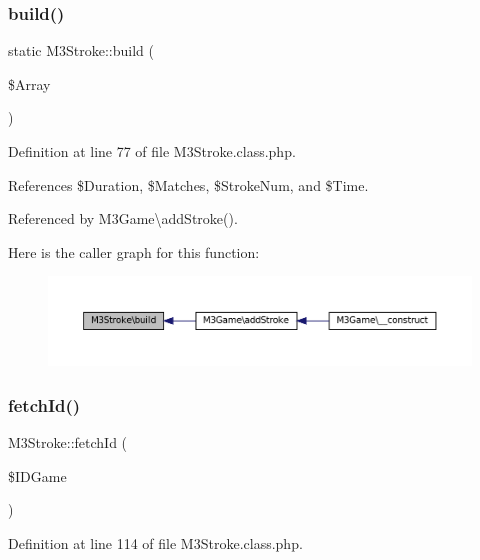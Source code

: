 \subsubsection{\texorpdfstring{build()}{build()}}
{\footnotesize\ttfamily static M3\+Stroke\+::build (\begin{DoxyParamCaption}\item[{}]{\$\+Array }\end{DoxyParamCaption})\hspace{0.3cm}{\ttfamily [static]}}



Definition at line 77 of file M3\+Stroke.\+class.\+php.



References \$\+Duration, \$\+Matches, \$\+Stroke\+Num, and \$\+Time.



Referenced by M3\+Game\textbackslash{}add\+Stroke().

Here is the caller graph for this function\+:\nopagebreak
\begin{figure}[H]
\begin{center}
\leavevmode
\includegraphics[width=350pt]{class_m3_stroke_a0a5e6074f1d4319f4af7cddca3565362_icgraph}
\end{center}
\end{figure}
\mbox{\label{class_m3_stroke_a576c40bd23077ab7457fb7d368c29d9f}} 
\subsubsection{\texorpdfstring{fetch\+Id()}{fetchId()}}
{\footnotesize\ttfamily M3\+Stroke\+::fetch\+Id (\begin{DoxyParamCaption}\item[{}]{\$\+I\+D\+Game }\end{DoxyParamCaption})\hspace{0.3cm}{\ttfamily [private]}}



Definition at line 114 of file M3\+Stroke.\+class.\+php.



